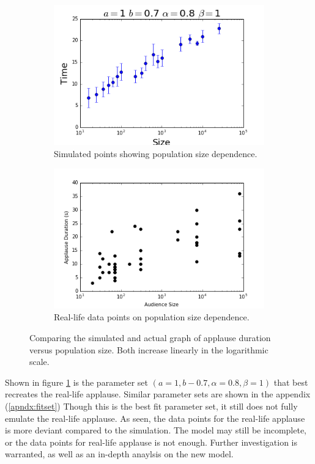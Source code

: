 \begin{figure}[h]
  \centering
  \begin{subfigure}[b]{0.3\linewidth}
    \includegraphics[width=\linewidth]{images/chapter4/confirmA.png}
    \caption{Simulated points showing population size dependence.}
  \end{subfigure}
  \begin{subfigure}[b]{0.3\linewidth}
    \includegraphics[width=\linewidth]{images/chapter4/4.png}
    \caption{Real-life data points on population size dependence.}
  \end{subfigure}
  \caption{Comparing the simulated and actual graph of applause duration versus population size. Both increase linearly in the logarithmic scale.}
  \label{fig:durXsizComp}
\end{figure}

Shown in figure \ref{fig:durXsizComp} is the parameter set $(a=1,b-0.7,\alpha=0.8,\beta=1)$ that best recreates the real-life applause. Similar parameter sets are shown in the appendix (\ref{apndx:fitset})
Though this is the best fit parameter set, it still does not fully emulate the real-life applause.
As seen, the data points for the real-life applause is more deviant compared to the simulation.
The model may still be incomplete, or the data points for real-life applause is not enough.
Further investigation is warranted, as well as an in-depth anaylsis on the new model.


